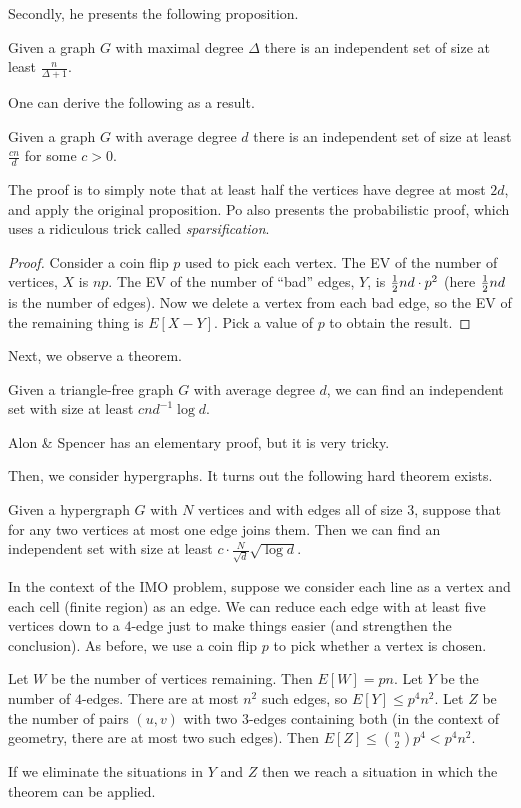 \documentclass[11pt]{scrreprt}
\numberwithin{figure}{chapter}
\begin{document}
Secondly, he presents the following proposition.
\begin{proposition*}
  Given a graph $G$ with maximal degree $\Delta$ there is an independent set of
  size at least $\frac{n}{\Delta + 1}$.
\end{proposition*}
One can derive the following as a result.
\begin{proposition*}
  Given a graph $G$ with average degree $d$ there is an independent set of size
  at least $\frac{cn}{d}$ for some $c > 0$.
\end{proposition*}
The proof is to simply note that at least half the vertices have degree at most $2d$,
and apply the original proposition.
Po also presents the probabilistic proof, which uses a ridiculous trick called \emph{sparsification}.
\begin{proof}
  Consider a coin flip $p$ used to pick each vertex.
  The EV of the number of vertices, $X$ is $np$.
  The EV of the number of ``bad'' edges, $Y$,
  is $\frac{1}{2} nd \cdot p^2$ (here $\frac{1}{2} nd$ is the number of edges).
  Now we delete a vertex from each bad edge, so the EV of the remaining thing is $E[X-Y]$.
  Pick a value of $p$ to obtain the result.
\end{proof}

Next, we observe a theorem.
\begin{theorem*}
  Given a triangle-free graph $G$ with average degree $d$,
  we can find an independent set with size at least $cnd^{-1} \log d$.
\end{theorem*}
Alon \& Spencer has an elementary proof, but it is very tricky.


Then, we consider hypergraphs. It turns out the following hard theorem exists.
\begin{theorem*}
  Given a hypergraph $G$ with $N$ vertices and with edges all of size $3$,
  suppose that for any two vertices at most one edge joins them.
  Then we can find an independent set with size at least $c \cdot \frac{N}{\sqrt d} \sqrt{\log d}$.
\end{theorem*}
In the context of the IMO problem,
suppose we consider each line as a vertex and each cell (finite region) as an edge.
We can reduce each edge with at least five vertices down to a $4$-edge just to
make things easier (and strengthen the conclusion).
As before, we use a coin flip $p$ to pick whether a vertex is chosen.
\begin{itemize}
  \ii Let $W$ be the number of vertices remaining. Then $E[W] = pn$.
  \ii Let $Y$ be the number of $4$-edges. There are at most $n^2$ such edges, so $E[Y] \le p^4n^2$.
  \ii Let $Z$ be the number of pairs $(u,v)$ with two $3$-edges containing both (in the context of geometry, there are at most two such edges).
  Then $E[Z] \le \binom n2 p^4 < p^4n^2$.
\end{itemize}
If we eliminate the situations in $Y$ and $Z$ then we reach a situation in which the theorem can be applied.
\end{document}
